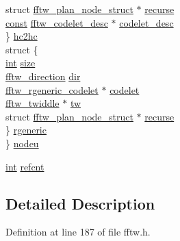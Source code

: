 \begin{DoxyCompactItemize}
\begin{tabbing}
\>\>struct \hyperlink{structfftw__plan__node__struct}{fftw\_plan\_node\_struct} $\ast$ \hyperlink{structfftw__plan__node__struct_aa3ffc937d4b754addf7d17b18b313c70}{recurse}\\
\>\>\hyperlink{getopt1_8c_a2c212835823e3c54a8ab6d95c652660e}{const} \hyperlink{structfftw__codelet__desc}{fftw\_codelet\_desc} $\ast$ \hyperlink{structfftw__plan__node__struct_a7cb707dc27fb4779fbd0ee9cb4d7efd9}{codelet\_desc}\\
\>\} \hyperlink{structfftw__plan__node__struct_a8904ddbe9f535dd76c51e14f6df840f3}{hc2hc}\\
\>struct \{\\
\>\>\hyperlink{xmltok_8h_a5a0d4a5641ce434f1d23533f2b2e6653}{int} \hyperlink{structfftw__plan__node__struct_a334e1fcc2c98575d85d9a951b9e95941}{size}\\
\>\>\hyperlink{fftw_8h_addfba51b1dc43e3660873b1ba9668cec}{fftw\_direction} \hyperlink{structfftw__plan__node__struct_a3e47d4ee7b8ecddc6dc465409e8c038a}{dir}\\
\>\>\hyperlink{fftw_8h_a96a0404820af1d388d2c0d71dc4ce85f}{fftw\_rgeneric\_codelet} $\ast$ \hyperlink{structfftw__plan__node__struct_a07acad07e31c415d9ab0445bb79e0127}{codelet}\\
\>\>\hyperlink{fftw_8h_a726c4a427d2f70038050e3048b783cb2}{fftw\_twiddle} $\ast$ \hyperlink{structfftw__plan__node__struct_a4a7244edea4157eb541d712ae30e2fab}{tw}\\
\>\>struct \hyperlink{structfftw__plan__node__struct}{fftw\_plan\_node\_struct} $\ast$ \hyperlink{structfftw__plan__node__struct_aa3ffc937d4b754addf7d17b18b313c70}{recurse}\\
\>\} \hyperlink{structfftw__plan__node__struct_a737b1685529202cdd4b32f8c4f6c83ce}{rgeneric}\\
\} \hyperlink{structfftw__plan__node__struct_a2bfdaac49b9216f5ddddd24f13f3b7f3}{nodeu}\\

\end{tabbing}\item 
\hyperlink{xmltok_8h_a5a0d4a5641ce434f1d23533f2b2e6653}{int} \hyperlink{structfftw__plan__node__struct_a06f58dea6a277300bfcedba74c8bc3ee}{refcnt}
\end{DoxyCompactItemize}


\subsection{Detailed Description}


Definition at line 187 of file fftw.\+h.



